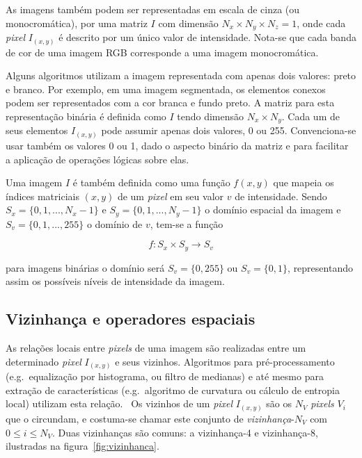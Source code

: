 As imagens também podem ser representadas em escala de cinza (ou
monocromática), por uma matriz $I$ com dimensão $N_x \times N_y \times
N_z = 1$, onde cada \textit{pixel} $I_{(x,y)}$ é descrito por um único valor de
intensidade. Nota-se que cada banda de cor de uma imagem RGB
corresponde a uma imagem monocromática.

Alguns algoritmos utilizam a imagem representada com apenas dois
valores: preto e branco. Por exemplo, em uma imagem segmentada, os
elementos conexos podem ser representados com a cor branca e fundo
preto. A matriz para esta representação binária é definida como $I$
tendo dimensão $N_x \times N_y$. Cada um de seus elementos $I_{(x,y)}$
pode assumir apenas dois valores, 0 ou 255. Convenciona-se usar também
os valores 0 ou 1, dado o aspecto binário da matriz e para facilitar a
aplicação de operações lógicas sobre elas.~\cite{gonzalez}

Uma imagem $I$ é também definida como uma função $f(x,y)$ que mapeia
os índices matriciais $(x,y)$ de um \textit{pixel} em seu valor $v$ de
intensidade. Sendo $S_x = \{0, 1, ..., N_x - 1\}$ e $S_y = \{0, 1,
..., N_y - 1\}$ o domínio espacial da imagem e $S_v = \{0, 1, ...,
255\}$ o domínio de $v$, tem-se a função

\begin{equation}
  f : S_x \times S_y \to S_v
\end{equation}

\noindent para imagens binárias o domínio será $S_v = \{0, 255\}$ ou $S_v = \{0,
1\}$, representando assim os possíveis níveis de intensidade da
imagem.~\cite{gonzalez}

\subsection{Vizinhança e operadores espaciais}

As relações locais entre \textit{pixels} de uma imagem são realizadas
entre um determinado \textit{pixel} $I_{(x,y)}$ e seus
vizinhos. Algoritmos para pré-processamento (e.g.\ equalização por
histograma, ou filtro de medianas) e até mesmo para extração de
características (e.g.\ algoritmo de curvatura ou cálculo de entropia
local) utilizam esta relação.~\cite{gonzalez} Os vizinhos de
um \textit{pixel} $I_{(x,y)}$ são os $N_V$ \textit{pixels} $V_i$ que o
circundam, e costuma-se chamar este conjunto
de \emph{vizinhança}-$N_V$ com $0 \leq i \leq N_V$. Duas vizinhanças
são comuns: a vizinhança-4 e vizinhança-8, ilustradas na figura~\ref{fig:vizinhanca}. 

